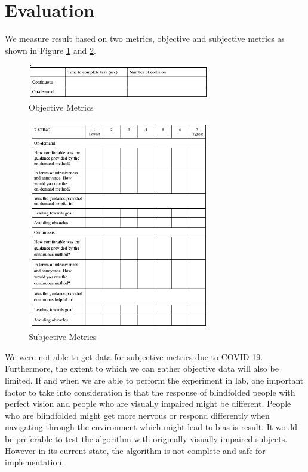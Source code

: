 \section{Evaluation}
We measure result based on two metrics, objective and subjective metrics as shown in Figure \ref{fig:objectiveMetrics} and \ref{fig:subjectiveMetrics}. 
\begin{figure}
\includegraphics[width=8cm]{img/objectivemetrics.png}
\caption{Objective Metrics}
\label{fig:objectiveMetrics}
\end{figure}
\begin{figure}
\includegraphics[width=8cm]{img/subjectivemetrics.png}
\caption{Subjective Metrics}
\label{fig:subjectiveMetrics}
\end{figure}
We were not able to get data for subjective metrics due to COVID-19. 
Furthermore, the extent to which we can gather objective data will also be limited. 
If and when we are able to perform the experiment in lab, one important factor to take into consideration is that the response of blindfolded people with perfect vision and people who are visually impaired might be different. 
People who are blindfolded might get more nervous or respond differently when navigating through the environment which might lead to bias is result. 
It would be preferable to test the algorithm with originally visually-impaired subjects. 
However in its current state, the algorithm is not complete and safe for implementation. 

